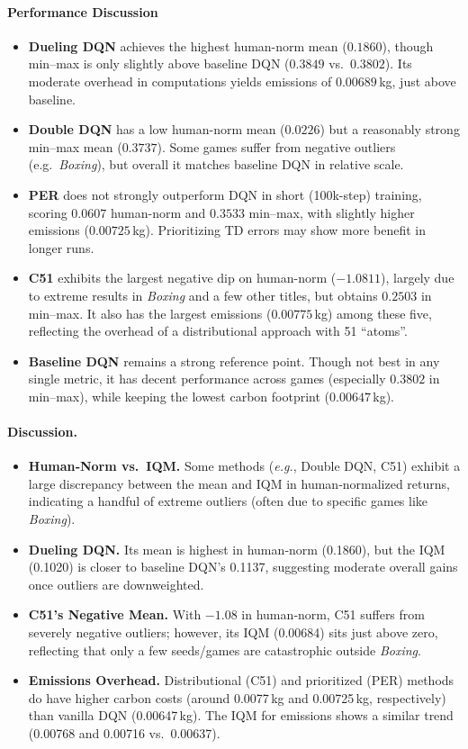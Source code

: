 \paragraph{Performance Discussion}
\begin{itemize}
	\item \textbf{Dueling DQN} achieves the highest human-norm mean ($0.1860$), 
	though min--max is only slightly above baseline DQN ($0.3849$ vs.\ $0.3802$). 
	Its moderate overhead in computations yields emissions of $0.00689$\,kg, 
	just above baseline.
	\item \textbf{Double DQN} has a low human-norm mean ($0.0226$) but a reasonably strong min--max mean ($0.3737$). 
	Some games suffer from negative outliers (e.g.\ \emph{Boxing}), 
	but overall it matches baseline DQN in relative scale.
	\item \textbf{PER} does not strongly outperform DQN in short (100k-step) training, 
	scoring $0.0607$ human-norm and $0.3533$ min--max, 
	with slightly higher emissions ($0.00725$\,kg). 
	Prioritizing TD errors may show more benefit in longer runs.
	\item \textbf{C51} exhibits the largest negative dip on human-norm ($-1.0811$), 
	largely due to extreme results in \emph{Boxing} and a few other titles, 
	but obtains $0.2503$ in min--max. 
	It also has the largest emissions ($0.00775$\,kg) among these five, 
	reflecting the overhead of a distributional approach with 51 “atoms”.
	\item \textbf{Baseline DQN} remains a strong reference point. 
	Though not best in any single metric, it has decent performance across games (especially $0.3802$ in min--max), 
	while keeping the lowest carbon footprint ($0.00647$\,kg). 
\end{itemize}

\paragraph{Discussion.}
\begin{itemize}
	\item \textbf{Human‐Norm vs.\ IQM.} 
	Some methods (\emph{e.g.}, Double DQN, C51) 
	exhibit a large discrepancy between the mean and IQM in human‐normalized returns, 
	indicating a handful of extreme outliers (often due to specific games like \emph{Boxing}).
	\item \textbf{Dueling DQN.} 
	Its mean is highest in human‐norm (0.1860), 
	but the IQM (0.1020) is closer to baseline DQN’s 0.1137, 
	suggesting moderate overall gains once outliers are downweighted.
	\item \textbf{C51’s Negative Mean.} 
	With $-1.08$ in human‐norm, C51 suffers from severely negative outliers; 
	however, its IQM (\num{0.00684}) sits just above zero, reflecting that only a few seeds/games 
	are catastrophic outside \emph{Boxing}.
	\item \textbf{Emissions Overhead.} 
	Distributional (C51) and prioritized (PER) methods do have higher carbon costs 
	(around 0.0077\,kg and 0.00725\,kg, respectively) than vanilla DQN (0.00647\,kg). 
	The IQM for emissions shows a similar trend (0.00768 and 0.00716 vs.\ 0.00637).
\end{itemize}

